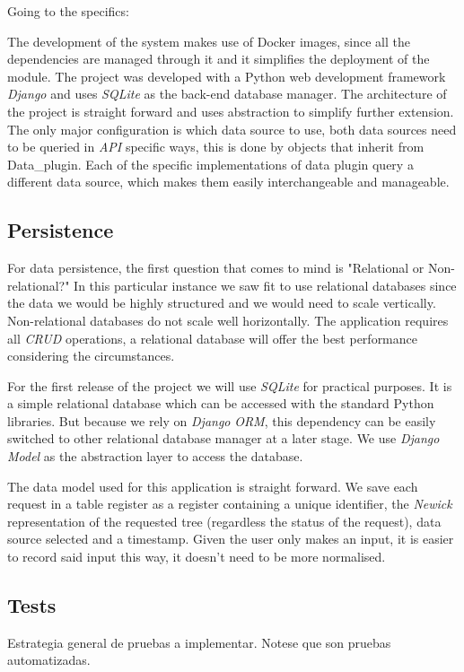 \documentclass[10pt]{article}
\begin{document}
 Going to the specifics:
 
The development of the system makes use of Docker images, since all the dependencies are managed through it and it simplifies the deployment of the module. The project was developed with a Python web development framework \textit{Django} and uses \textit{SQLite} as the back-end database manager. The architecture of the project is straight forward and uses abstraction to simplify further extension. The only major configuration is which data source to use, both data sources need to be queried in \textit{API} specific ways, this is done by objects that inherit from Data\_plugin. Each of the specific implementations of data plugin query a different data source, which makes them easily interchangeable and manageable.

 \subsection{Persistence}
 
For data persistence, the first question that comes to mind is "Relational or Non-relational?" In this particular instance we saw fit to use relational databases since the data we would be highly structured and we would need to scale vertically. Non-relational databases do not scale well horizontally. The application requires all \textit{CRUD} operations, a relational database will offer the best performance considering the circumstances.

For the first release of the project we will use \textit{SQLite} for practical purposes. It is a simple relational database which can be accessed with the standard Python libraries. But because we rely on \textit{Django} \textit{ORM}, this dependency can be easily switched to other relational database manager at a later stage. We use \textit{Django Model} as the abstraction layer to access the database.

The data model used for this application is straight forward. We save each request in a table register as a register containing a unique identifier, the \textit{Newick} representation of the requested tree (regardless the status of the request), data source selected and a timestamp. Given the user only makes an input, it is easier to record said input this way, it doesn't need to be more normalised.
 
 \subsection{Tests}
 Estrategia general de pruebas a implementar. Notese que son pruebas automatizadas.
\end{document}
